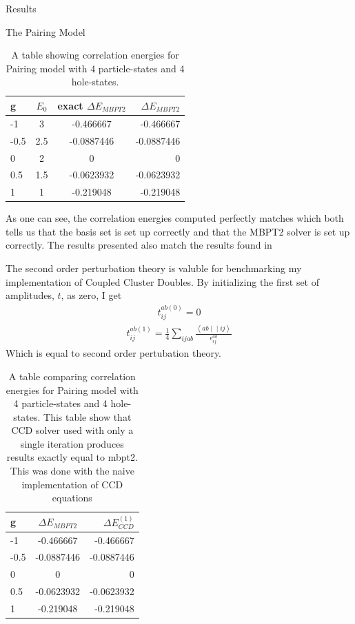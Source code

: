 \documentclass[twoside,english]{uiofysmaster}
\begin{document}
\begin{chapter}{Results}
\begin{section}{The Pairing Model}
		\begin{table}[H]
			\begin{center}
				\begin{tabular}[center]{l | c | c | r}
					g & $E_0$ & exact $ \Delta E_{MBPT2}$  & $\Delta E_{MBPT2}$ \\
					\hline
					-1 & 3 & -0.466667 & -0.466667 \\
					-0.5 & 2.5 & -0.0887446 & -0.0887446 \\
					0 & 2 & 0 & 0 \\
					0.5 & 1.5 & -0.0623932 & -0.0623932 \\
					1 & 1 & -0.219048 & -0.219048
				\end{tabular}
			\end{center}
			\caption{A table showing correlation energies for Pairing model with 4 particle-states and 4 hole-states.  }
			\label{Results1}
		\end{table}
		As one can see, the correlation energies computed perfectly matches which both tells us that the basis set is set up correctly and that the MBPT2 solver is set up correctly. The results presented also match the results found in \cite{Hjorth-Jensen2016}

		The second order perturbation theory is valuble for benchmarking my implementation of Coupled Cluster Doubles. By initializing the first set of amplitudes, $t$, as zero, I get
		\begin{align}
			t_{ij}^{ab(0)} = 0  
		\end{align}
		\begin{align}
			t_{ij}^{ab(1)} = \frac{1}{4} \sum_{ijab} \frac{\left<ab\middle|\middle|ij\right>}{\epsilon_{ij}^{ab}} 
 		\end{align}
 		Which is equal to second order pertubation theory. 
 		\begin{table}[H]
			\begin{center}
				\begin{tabular}[center]{l | c | r}
					g & $ \Delta E_{MBPT2}$  & $\Delta E_{CCD}^{(1)}$ \\
					\hline
					-1 & -0.466667 & -0.466667 \\
					-0.5 & -0.0887446 & -0.0887446 \\
					0 & 0 & 0 \\
					0.5 & -0.0623932 & -0.0623932 \\
					1 & -0.219048 & -0.219048
				\end{tabular}
			\end{center}
			\caption{A table comparing correlation energies for Pairing model with 4 particle-states and 4 hole-states. This table show that CCD solver used with only a single iteration produces results exactly equal to mbpt2. This was done with the naive implementation of CCD equations}
			\label{Results2}
		\end{table}


\end{section}
\end{chapter}
\end{document}

